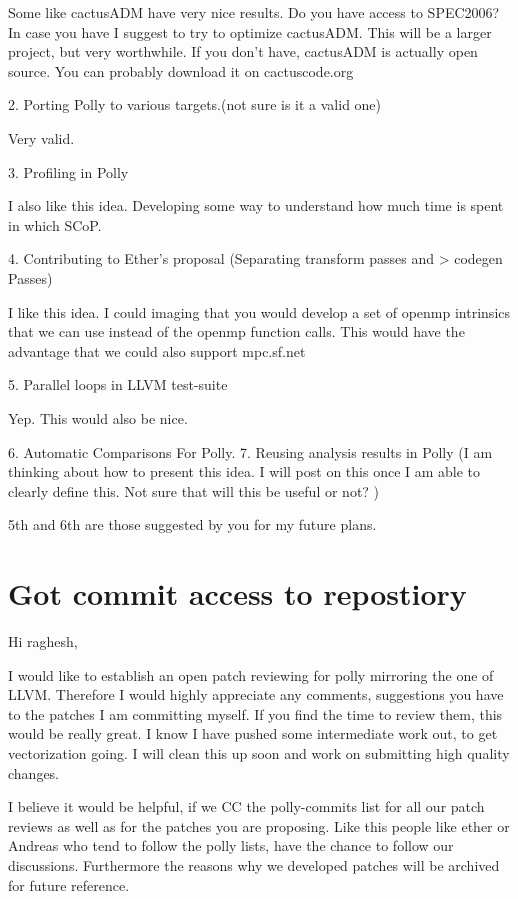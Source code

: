 \documentclass[a4paper,10pt]{article}
\begin{document}
	Some like cactusADM have very nice results. Do you have access to SPEC2006? In case you have I suggest to try to optimize cactusADM.
	This will be a larger project, but very worthwhile. If you don't have,
	     cactusADM is actually open source. You can probably download it
		     on cactuscode.org

		     2. Porting Polly to various targets.(not sure is it a valid one)

		     Very valid.

		      3. Profiling in Polly

		     I also like this idea. Developing some way to understand how much time is spent in which SCoP.

		      4. Contributing to Ether's proposal (Separating transform passes and
				     > codegen Passes)

		     I like this idea. I could imaging that you would develop a set of openmp
		     intrinsics that we can use instead of the openmp function calls. This
		     would have the advantage that we could also support mpc.sf.net

		      5. Parallel loops in LLVM test-suite

		     Yep. This would also be nice.

		      6. Automatic Comparisons For Polly.
		      7. Reusing analysis results in Polly (I am thinking about how to
				     present this idea. I will post on this once I am able to clearly
				     define this. Not sure that will this be useful or not? )

		     5th and 6th are those suggested by you for my future plans.

		     
\section{Got commit access to repostiory}
Hi raghesh,

   I would like to establish an open patch reviewing for polly mirroring the one of LLVM. Therefore I would highly appreciate any comments, suggestions you have to the patches I am committing myself. If you find the time to review them, this would be really great. I know I have pushed some intermediate work out, to get vectorization going. I will clean this up soon and work on submitting high quality changes.

   I believe it would be helpful, if we CC the polly-commits list for all our patch reviews as well as for the patches you are proposing. Like this people like ether or Andreas who tend to follow the polly lists, have the chance to follow our discussions. Furthermore the reasons why we developed patches will be archived for future reference.
\end{document}
